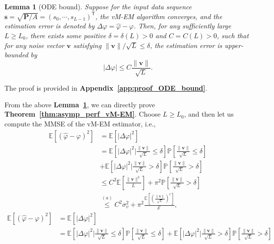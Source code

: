 \documentclass[journal,twocolumn]{IEEEtran}
\newtheorem{lemma}{\bf Lemma}
\theoremstyle{nonumberplain}
\def \T {\bm \Theta}
\def \T {^{\mathsf{T}}}
\begin{document}
{\begin{lemma}[ODE bound] \label{lemma:ODE-bound}
    Suppose for the input data sequence ${\bm s} = \sqrt{{\bm P}/A} = (s_0, \cdots, s_{L-1})\T$, the vM-EM algorithm converges, and the estimation error is denoted by $\Delta\varphi = \hat{\varphi} - \varphi$. Then, for any sufficiently large $L\geq L_0$, there exists some positive $\delta = \delta(L)>0$ and $C=C(L)>0$, such that for any noise vector ${\bm v}$ satisfying $\|{\bm v}\|/\sqrt{L} \leq \delta$, the estimation error is upper-bounded by
    \begin{equation}
        |\Delta\varphi|\leq C \frac{\|{\bm v}\|}{\sqrt{L}}. 
    \end{equation}
\end{lemma}
\begin{IEEEproof}
    The proof is provided in {\bf Appendix~\ref{app:proof_ODE_bound}}. 
\end{IEEEproof}
From the above {\bf Lemma~\ref{lemma:ODE-bound}}, we can directly prove {\bf Theorem~\ref{thm:asymp_perf_vM-EM}}. Choose $L\geq L_0$, and then let us compute the MMSE of the vM-EM estimator, i.e., 
\ifx\onecol\undefined
\begin{equation}
    \begin{aligned}
    \mathbb{E}[(\hat{\varphi}-\varphi)^2] &= \mathbb{E}[|\Delta\varphi|^2] \\
    &= \mathbb{E}\left[|\Delta\varphi|^2 \Bigg|\frac{\|{\bm v}\|}{\sqrt{L}} \leq \delta \right]\mathbb{P}\left[\frac{\|{\bm v}\|}{\sqrt{L}} \leq \delta \right] \\
    & + \mathbb{E}\left[|\Delta\varphi|^2 \Bigg|\frac{\|{\bm v}\|}{\sqrt{L}} > \delta \right]\mathbb{P}\left[\frac{\|{\bm v}\|}{\sqrt{L}}>\delta \right] \\
    & \leq C^2 \mathbb{E}\left[\frac{\|{\bm v}\|^2}{L}\right] + \pi^2 \mathbb{P}\left[\frac{\|{\bm v}\|}{\sqrt{L}}>\delta\right] \\
    & \overset{(a)}{\leq} C^2\sigma_v^2 + \pi^2 \frac{\mathbb{E}\left[\left(\frac{\|{\bm v}\|}{\sqrt{L}}\right)^r\right]}{\delta^r},
    \end{aligned}
\end{equation}
\else 
\begin{equation}
    \begin{aligned}
    \mathbb{E}[(\hat{\varphi}-\varphi)^2] &= \mathbb{E}[|\Delta\varphi|^2] \\
    &= \mathbb{E}\left[|\Delta\varphi|^2 \Bigg|\frac{\|{\bm v}\|}{\sqrt{L}} \leq \delta \right]\mathbb{P}\left[\frac{\|{\bm v}\|}{\sqrt{L}} \leq \delta \right] + \mathbb{E}\left[|\Delta\varphi|^2 \Bigg|\frac{\|{\bm v}\|}{\sqrt{L}} > \delta \right]\mathbb{P}\left[\frac{\|{\bm v}\|}{\sqrt{L}}>\delta \right] \\

\end{aligned}
\end{equation}}
\end{document}
